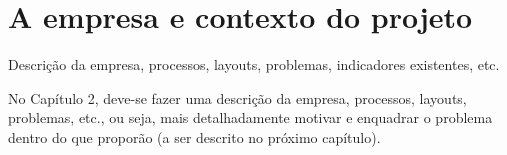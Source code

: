 \chapter{A empresa e contexto do projeto}

Descrição da empresa, processos, layouts, problemas, indicadores existentes, etc.

No Capítulo 2, deve-se fazer uma descrição da empresa, processos, layouts, problemas, etc., ou seja, mais detalhadamente motivar e enquadrar o problema dentro do que proporão (a ser descrito no próximo capítulo).
